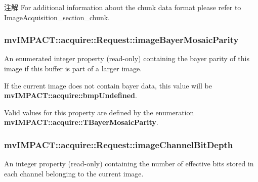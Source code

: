 \begin{DoxyNote}{注解}
For additional information about the chunk data format please refer to Image\+Acquisition\+\_\+section\+\_\+chunk. 
\end{DoxyNote}
\hypertarget{classmv_i_m_p_a_c_t_1_1acquire_1_1_request_a4db5758c23b9167a1af7da2f9829289a}{
\subsubsection[{image\+Bayer\+Mosaic\+Parity}]{ mv\+I\+M\+P\+A\+C\+T\+::acquire\+::\+Request\+::image\+Bayer\+Mosaic\+Parity}}\label{classmv_i_m_p_a_c_t_1_1acquire_1_1_request_a4db5758c23b9167a1af7da2f9829289a}


An enumerated integer property {\bfseries }(read-\/only) containing the bayer parity of this image if this buffer is part of a larger image. 

If the current image does not contain bayer data, this value will be {\bfseries mv\+I\+M\+P\+A\+C\+T\+::acquire\+::bmp\+Undefined}.

Valid values for this property are defined by the enumeration {\bfseries mv\+I\+M\+P\+A\+C\+T\+::acquire\+::\+T\+Bayer\+Mosaic\+Parity}. \hypertarget{classmv_i_m_p_a_c_t_1_1acquire_1_1_request_aee32f6b6dabfd192119afa932045ecbe}{
\subsubsection[{image\+Channel\+Bit\+Depth}]{ mv\+I\+M\+P\+A\+C\+T\+::acquire\+::\+Request\+::image\+Channel\+Bit\+Depth}}\label{classmv_i_m_p_a_c_t_1_1acquire_1_1_request_aee32f6b6dabfd192119afa932045ecbe}


An integer property {\bfseries }(read-\/only) containing the number of effective bits stored in each channel belonging to the current image. 

